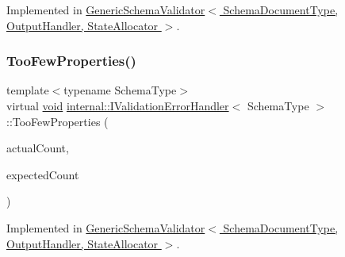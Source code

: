 Implemented in \hyperlink{classGenericSchemaValidator_af39007d9bf43126dab231961a1c5064f}{Generic\+Schema\+Validator$<$ Schema\+Document\+Type, Output\+Handler, State\+Allocator $>$}.

\mbox{\label{classinternal_1_1IValidationErrorHandler_adf515d2fad2e55bc0735a6fb16eec9e6}} 
\subsubsection{\texorpdfstring{Too\+Few\+Properties()}{TooFewProperties()}}
{\footnotesize\ttfamily template$<$typename Schema\+Type$>$ \\
virtual \hyperlink{imgui__impl__opengl3__loader_8h_ac668e7cffd9e2e9cfee428b9b2f34fa7}{void} \hyperlink{classinternal_1_1IValidationErrorHandler}{internal\+::\+I\+Validation\+Error\+Handler}$<$ Schema\+Type $>$\+::Too\+Few\+Properties (\begin{DoxyParamCaption}\item[{\hyperlink{rapidjson_8h_a5ed6e6e67250fadbd041127e6386dcb5}{Size\+Type}}]{actual\+Count,  }\item[{\hyperlink{rapidjson_8h_a5ed6e6e67250fadbd041127e6386dcb5}{Size\+Type}}]{expected\+Count }\end{DoxyParamCaption})\hspace{0.3cm}{\ttfamily [pure virtual]}}



Implemented in \hyperlink{classGenericSchemaValidator_aaebaf28aa289826a3c39dc953b0ca466}{Generic\+Schema\+Validator$<$ Schema\+Document\+Type, Output\+Handler, State\+Allocator $>$}.

\mbox{\label{classinternal_1_1IValidationErrorHandler_ae000553bd9312a5090eed393541243af}} 
